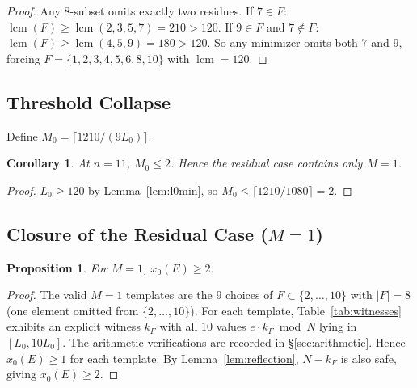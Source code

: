 \documentclass[11pt]{article}
\newtheorem{proposition}[theorem]{Proposition}
\newtheorem{corollary}[theorem]{Corollary}
\theoremstyle{definition}
\newcommand{\lcm}{\operatorname{lcm}}
\begin{document}
\begin{proof}
  Any $8$-subset omits exactly two residues.
  If $7 \in F$: $\lcm(F) \geq \lcm(2,3,5,7) = 210 > 120$.
  If $9 \in F$ and $7 \notin F$: $\lcm(F) \geq \lcm(4,5,9) = 180 > 120$.
  So any minimizer omits both $7$ and $9$, forcing
  $F = \{1,2,3,4,5,6,8,10\}$ with $\lcm = 120$.
\end{proof}

\subsection{Threshold Collapse}
\label{sec:threshold}

Define $M_0 = \lceil 1210 / (9 L_0) \rceil$.

\begin{corollary}
  \label{cor:threshold}
  At $n = 11$, $M_0 \leq 2$. Hence the residual case contains only
  $M = 1$.
\end{corollary}

\begin{proof}
  $L_0 \geq 120$ by Lemma~\ref{lem:l0min}, so
  $M_0 \leq \lceil 1210/1080 \rceil = 2$.
\end{proof}

\subsection{Closure of the Residual Case ($M = 1$)}
\label{sec:residual}

\begin{proposition}
  \label{prop:residual}
  For $M = 1$, $x_0(E) \geq 2$.
\end{proposition}

\begin{proof}
  The valid $M = 1$ templates are the $9$ choices of $F \subset
  \{2,\ldots,10\}$ with $|F| = 8$ (one element omitted from
  $\{2,\ldots,10\}$).
  For each template, Table~\ref{tab:witnesses} exhibits an explicit
  witness $k_F$ with all $10$ values $e \cdot k_F \bmod N$ lying in
  $[L_0, 10L_0]$.
  The arithmetic verifications are recorded in \S\ref{sec:arithmetic}.
  Hence $x_0(E) \geq 1$ for each template.
  By Lemma~\ref{lem:reflection}, $N - k_F$ is also safe, giving
  $x_0(E) \geq 2$.
\end{proof}
\end{document}
